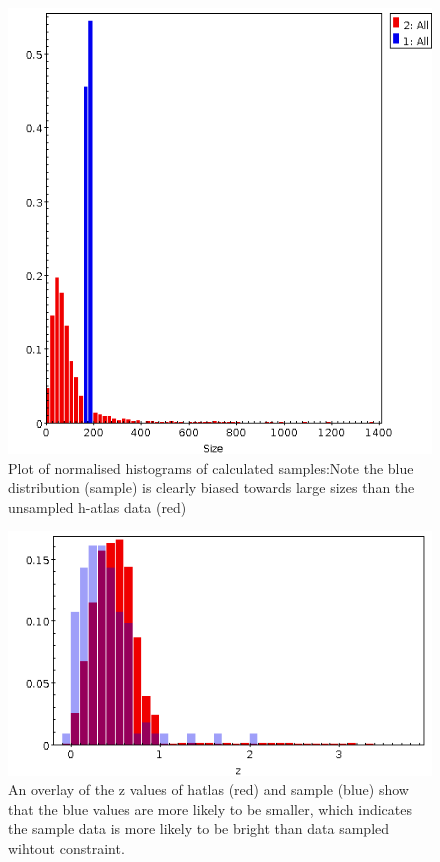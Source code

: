 \documentclass{article}
\begin{document}
\begin{figure}
    \centering
    \includegraphics[scale = 0.4]{hatlassamplesize.png}
    \caption{Plot of normalised histograms of calculated samples:Note the blue distribution (sample) is clearly biased towards large sizes than the unsampled h-atlas data (red)}
\end{figure}


\begin{figure}
    \centering
    \includegraphics[scale = 0.4]{hatlasandsamplez.png}
    \caption{An overlay of the z values of hatlas (red) and sample (blue) show that the blue values are more likely to be smaller, which indicates the sample data is more likely to be bright than data sampled wihtout constraint.}
\end{figure}
\end{document}
